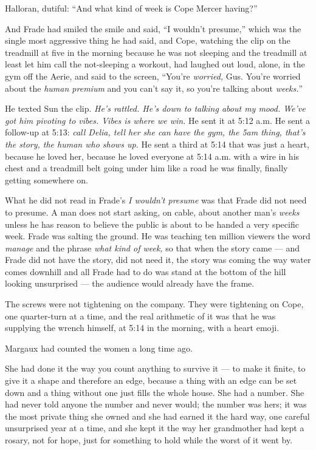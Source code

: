 \documentclass[11pt,openany]{book}
\newcommand{\scenebreak}{\par\vspace{0.5\baselineskip}\begin{center}\textasteriskcentered\quad\textasteriskcentered\quad\textasteriskcentered\end{center}\vspace{0.5\baselineskip}\par}
\begin{document}
Halloran, dutiful: ``And what kind of week is Cope Mercer having?''

And Frade had smiled the smile and said, ``I wouldn't presume,'' which was the single most aggressive thing he had said, and Cope, watching the clip on the treadmill at five in the morning because he was not sleeping and the treadmill at least let him call the not-sleeping a workout, had laughed out loud, alone, in the gym off the Aerie, and said to the screen, ``You're \textit{worried,} Gus. You're worried about the \textit{human premium} and you can't say it, so you're talking about \textit{weeks.}''

He texted Sun the clip. \textit{He's rattled. He's down to talking about my mood. We've got him pivoting to vibes. Vibes is where we win.} He sent it at 5:12 a.m. He sent a follow-up at 5:13: \textit{call Delia, tell her she can have the gym, the 5am thing, that's the story, the human who shows up.} He sent a third at 5:14 that was just a heart, because he loved her, because he loved everyone at 5:14 a.m. with a wire in his chest and a treadmill belt going under him like a road he was finally, finally getting somewhere on.

What he did not read in Frade's \textit{I wouldn't presume} was that Frade did not need to presume. A man does not start asking, on cable, about another man's \textit{weeks} unless he has reason to believe the public is about to be handed a very specific week. Frade was salting the ground. He was teaching ten million viewers the word \textit{manage} and the phrase \textit{what kind of week,} so that when the story came --- and Frade did not have the story, did not need it, the story was coming the way water comes downhill and all Frade had to do was stand at the bottom of the hill looking unsurprised --- the audience would already have the frame.

The screws were not tightening on the company. They were tightening on Cope, one quarter-turn at a time, and the real arithmetic of it was that he was supplying the wrench himself, at 5:14 in the morning, with a heart emoji.


\scenebreak


Margaux had counted the women a long time ago.

She had done it the way you count anything to survive it --- to make it finite, to give it a shape and therefore an edge, because a thing with an edge can be set down and a thing without one just fills the whole house. She had a number. She had never told anyone the number and never would; the number was hers; it was the most private thing she owned and she had earned it the hard way, one careful unsurprised year at a time, and she kept it the way her grandmother had kept a rosary, not for hope, just for something to hold while the worst of it went by.
\end{document}

